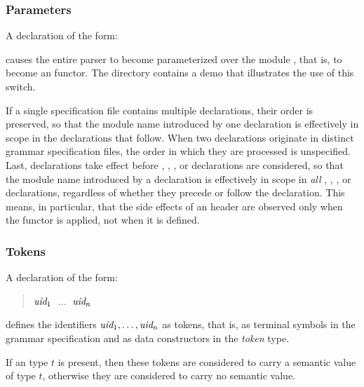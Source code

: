 \documentclass[onecolumn,11pt,nocopyrightspace,preprint]{sigplanconf}
\begin{document}
\subsubsection{Parameters}
\label{sec:parameter}

A declaration of the form:
\begin{quote}
\dparameter \ocamlparam
\end{quote}
causes the entire parser to become parameterized over the \ocaml module
, that is, to become an \ocaml functor. The directory
 contains a demo that illustrates the use of this switch.

If a single specification file
contains multiple \dparameter declarations, their order is preserved, so that
the module name  introduced by one declaration is effectively in scope
in the declarations that follow. When two \dparameter declarations originate
in distinct grammar specification files, the order in which they are processed
is unspecified. Last, \dparameter declarations take effect before \dheader{$\ldots$},
\dtoken, \dtype, or \dstart declarations are considered, so that the module name
 introduced by a \dparameter declaration is effectively in scope in
\emph{all} \dheader{$\ldots$}, \dtoken, \dtype, or \dstart declarations,
regardless of whether they precede or follow the \dparameter declaration.
This means, in particular, that the side effects of an \ocaml header are
observed only when the functor is applied, not when it is defined.

\subsubsection{Tokens}
\label{sec:tokens}

A declaration of the form:
\begin{quote}
\dtoken
\optional{\ocamltype}
$\textit{uid}_1$  $\;\ldots\;$
$\textit{uid}_n$ 
\end{quote}
defines the identifiers $\textit{uid}_1, \ldots, \textit{uid}_n$ as tokens, that is,
as terminal symbols in the grammar specification and as data constructors in
the \textit{token} type.

If an \ocaml type $t$ is present, then these tokens are considered to carry a
semantic value of type $t$, otherwise they are considered to carry no semantic
value.
\end{document}
